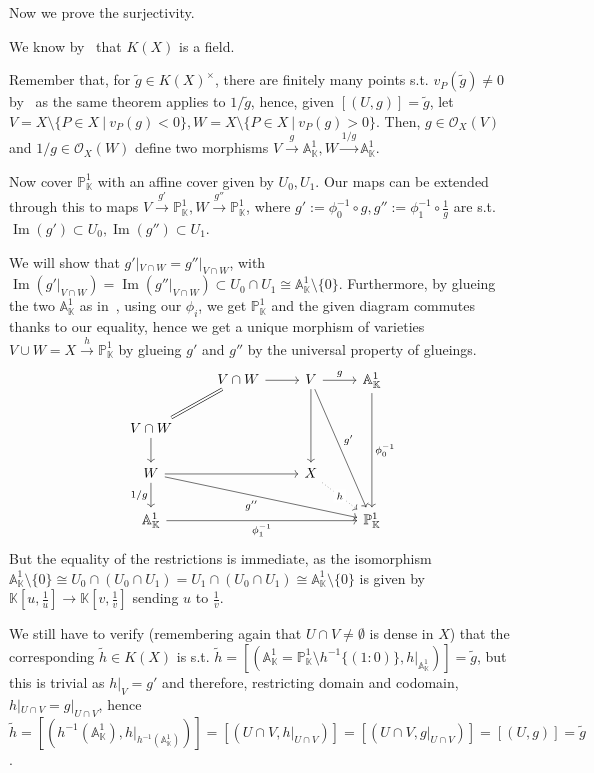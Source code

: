 \documentclass{article}
\newcommand{\numberset}{\mathbb}
\newcommand{\K}{\numberset{K}}
\newcommand{\A}{\mathbb{A}}
\newcommand{\Ps}{\mathbb{P}}
\DeclareMathOperator{\Ima}{Im}
\begin{document}
Now we prove the surjectivity.

We know by~\cite[prop. 6.5.3(iii)]{edix} that $K(X)$ is a field.

Remember that, for $\tilde{g}\in K(X)^{\times}$, there are finitely many points s.t. $v_P(\tilde{g})\neq 0$ by~\cite[prop. 8.2.8]{edix} as the same theorem applies to $1/\tilde{g}$, hence, given $[(U,g)]=\tilde{g}$, let $V=X\setminus\{P\in X\ |\ v_P(g)<0\}, W=X\setminus\{P\in X\ |\ v_P(g)>0\}$. Then, $g\in\mathcal{O}_X(V)$ and $1/g\in\mathcal{O}_X(W)$ define two morphisms $V\xrightarrow{g}\A^1_{\K}, W\xrightarrow{1/g}\A^1_{\K}$.

Now cover $\Ps^1_{\K}$ with an affine cover given by $U_0,U_1$. Our maps can be extended through this to maps $V\xrightarrow{g'}\Ps^1_{\K},W\xrightarrow{g''}\Ps^1_{\K}$, where $g':=\phi_0^{-1}\circ g, g'':=\phi_1^{-1}\circ\frac{1}{g}$ are s.t. $\Ima(g')\subset U_0,\Ima(g'')\subset U_1$.

We will show that $g'|_{V\cap W}=g''|_{V\cap W}$, with  $\Ima(g'|_{V\cap W})=\Ima(g''|_{V\cap W})\subset U_0\cap U_1\cong\A^1_{\K}\setminus\{0\}$. Furthermore, by glueing the two $\A^1_{\K}$ as in~\cite[ex. 6.2.4]{edix}, using our $\phi_i$, we get $\Ps^1_{\K}$ and the given diagram commutes thanks to our equality, hence we get a unique morphism of varieties $V\cup W=X\xrightarrow{h}\Ps^1_{\K}$ by glueing $g'$ and $g''$ by the universal property of glueings.
\[
  \begin{tikzcd}
    & V\cap W\arrow{r}\ar[dl,equal]
    & V\arrow{r}{g}\arrow{dddr}{g'}\arrow{dd}
    & \A^1_{\K}\arrow{ddd}{\phi_0^{-1}} \\
    V\cap W\arrow{d} \\
    W\arrow[swap]{d}{1/g}\arrow[swap]{drrr}{g''}\arrow{rr}
    && X\arrow[dotted]{dr}[description]{h} \\
    \A^1_{\K}\arrow[swap]{rrr}{\phi_1^{-1}}
    &&& \Ps^1_{\K}
  \end{tikzcd}
\]
But the equality of the restrictions is immediate, as the isomorphism $\A^1_{\K}\setminus\{0\}\cong U_0\cap(U_0\cap U_1)= U_1\cap (U_0\cap U_1)\cong\A^1_{\K}\setminus\{0\}$ is given by $\K[u,\frac{1}{u}]\rightarrow\K[v,\frac{1}{v}]$ sending $u$ to $\frac{1}{v}$.

We still have to verify (remembering again that $U\cap V\neq\emptyset$ is dense in $X$) that the corresponding $\tilde{h}\in K(X)$ is s.t. $\tilde{h}=[(\A^1_{\K}=\Ps^1_{\K}\setminus h^{-1}\{(1:0)\},h|_{\A^1_{\K}})]=\tilde{g}$, but this is trivial as $h|_V=g'$ and therefore, restricting domain and codomain, $h|_{U\cap V}=g|_{U\cap V}$, hence $\tilde{h}=[(h^{-1}(\A^1_{\K}),h|_{h^{-1}(\A^1_{\K})})]=[(U\cap V,h|_{U\cap V})]=[(U\cap V,g|_{U\cap V})]=[(U,g)]=\tilde{g}$.
\end{document}
